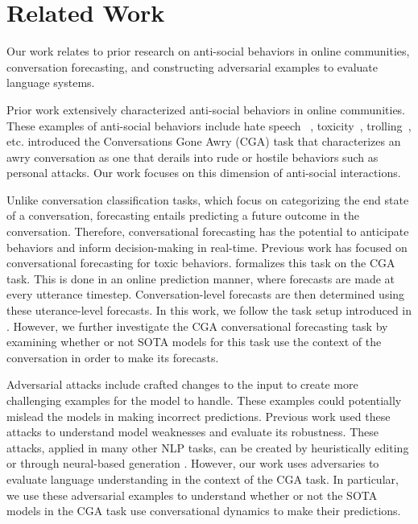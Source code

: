 \section{Related Work}
Our work relates to prior research on anti-social behaviors in online 
communities, conversation forecasting, and constructing adversarial examples
to evaluate language systems.

Prior work extensively characterized anti-social behaviors in online communities.
%
These examples of anti-social behaviors include hate speech ~\citep{rottger-etal-2021-hatecheck, elsherief-etal-2021-latent}, 
toxicity~\citep{pavlopoulos-etal-2020-toxicity, bespalov-etal-2023-towards}, trolling~\citep{mojica-de-la-vega-ng-2018-modeling, lee-etal-2022-elf22}, etc. 
%
\citet{zhang-etal-2018-conversations} introduced the Conversations Gone Awry (CGA)
task that characterizes an awry conversation as one that derails into rude or 
hostile behaviors such as personal attacks. 
%
Our work focuses on this dimension of anti-social interactions.

Unlike conversation classification tasks, which focus on categorizing the end 
state of a conversation, forecasting entails predicting a future outcome in 
the conversation. 
%
Therefore, conversational forecasting has the potential to anticipate behaviors 
and inform decision-making in real-time.
%
Previous work has focused on conversational forecasting for toxic behaviors. 
%
\citet{chang-danescu-niculescu-mizil-2019-trouble} formalizes this task on the CGA 
task. 
%
This is done in an online prediction manner, where forecasts are made at every 
utterance timestep.
%
Conversation-level forecasts are then determined using these uterance-level forecasts.
%
In this work, we follow the task setup introduced in 
\citet{chang-danescu-niculescu-mizil-2019-trouble}.
%
However, we further investigate the CGA conversational forecasting task 
by examining whether or not SOTA models for this task use the context of 
the conversation in order to make its forecasts.


Adversarial attacks include crafted changes to the input to create more challenging
examples for the model to handle.
%
These examples could potentially mislead the models in making incorrect predictions.
%
Previous work used these attacks to understand model weaknesses and evaluate its 
robustness.
%
These attacks, applied in many other NLP tasks,  can be created by heuristically editing \cite{wang-bansal-2018-robust} or through neural-based generation \cite{iyyer-etal-2018-adversarial, khashabi-etal-2020-bang, bartolo-etal-2021-improving, fu-etal-2023-scene}.
%
However, our work uses adversaries to evaluate language understanding in the context of 
the CGA task. 
%
In particular, we use these adversarial examples to understand whether or not the 
SOTA models in the CGA task use conversational dynamics to make their predictions.
